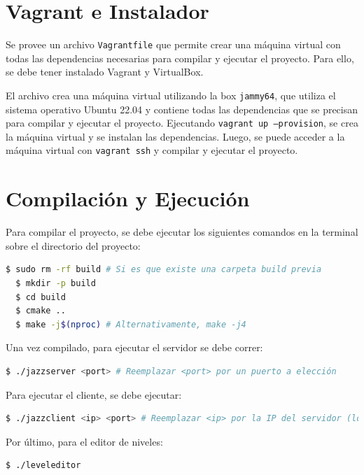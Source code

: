 \documentclass[titlepage,a4paper]{article}
\begin{document}
\section{Vagrant e Instalador}
Se provee un archivo \texttt{Vagrantfile} que permite crear una máquina virtual con todas las dependencias necesarias para compilar y ejecutar el proyecto. Para ello, se debe tener instalado Vagrant y VirtualBox.

El archivo crea una máquina virtual utilizando la box \texttt{jammy64}, que utiliza el sistema operativo Ubuntu 22.04 y contiene todas las dependencias que se precisan para compilar y ejecutar el proyecto. 
Ejecutando \texttt{vagrant up --provision}, se crea la máquina virtual y se instalan las dependencias. Luego, se puede acceder a la máquina virtual con \texttt{vagrant ssh} y compilar y ejecutar el proyecto.

\section{Compilación y Ejecución}
Para compilar el proyecto, se debe ejecutar los siguientes comandos en la terminal sobre el directorio del proyecto:

\begin{lstlisting}[language=sh,caption=Compilación del Proyecto, captionpos=b]
  $ sudo rm -rf build # Si es que existe una carpeta build previa
  $ mkdir -p build
  $ cd build
  $ cmake ..
  $ make -j$(nproc) # Alternativamente, make -j4
\end{lstlisting}

Una vez compilado, para ejecutar el servidor se debe correr:

\begin{lstlisting}[language=sh,caption=Ejecución del Servidor, captionpos=b]
  $ ./jazzserver <port> # Reemplazar <port> por un puerto a elección
\end{lstlisting}

Para ejecutar el cliente, se debe ejecutar:

\begin{lstlisting}[language=sh,caption=Ejecución del Cliente, captionpos=b]
  $ ./jazzclient <ip> <port> # Reemplazar <ip> por la IP del servidor (localhost) y <port> por el puerto
\end{lstlisting}

Por último, para el editor de niveles:

\begin{lstlisting}[language=sh,caption=Ejecución del Editor de Niveles, captionpos=b]
  $ ./leveleditor
\end{lstlisting}
\end{document}

